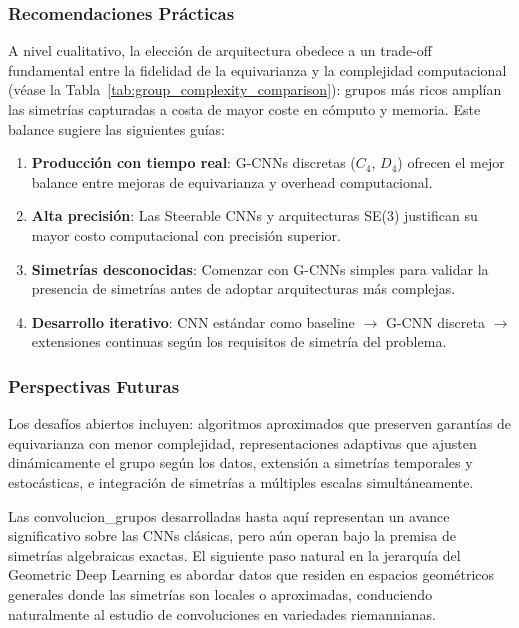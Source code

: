 \subsubsection{Recomendaciones Prácticas}\label{subsubsec:tradeoffs_recomendaciones}

A nivel cualitativo, la elección de arquitectura obedece a un trade-off fundamental entre la fidelidad de la equivarianza y la complejidad computacional (véase la Tabla~\ref{tab:group_complexity_comparison}): grupos más ricos amplían las simetrías capturadas a costa de mayor coste en cómputo y memoria. Este balance sugiere las siguientes guías:

\begin{enumerate}
    \item \textbf{Producción con tiempo real}: G-CNNs discretas ($C_4$, $D_4$) ofrecen el mejor balance entre mejoras de equivarianza y overhead computacional.
    \item \textbf{Alta precisión}: Las Steerable CNNs y arquitecturas SE(3) justifican su mayor costo computacional con precisión superior.
    \item \textbf{Simetrías desconocidas}: Comenzar con G-CNNs simples para validar la presencia de simetrías antes de adoptar arquitecturas más complejas.
    \item \textbf{Desarrollo iterativo}: CNN estándar como baseline $\to$ G-CNN discreta $\to$ extensiones continuas según los requisitos de simetría del problema.
\end{enumerate}

\subsubsection{Perspectivas Futuras}\label{subsubsec:perspectivas_desarrollo_futuro}

Los desafíos abiertos incluyen: algoritmos aproximados que preserven garantías de equivarianza con menor complejidad, representaciones adaptivas que ajusten dinámicamente el grupo según los datos, extensión a simetrías temporales y estocásticas, e integración de simetrías a múltiples escalas simultáneamente.

Las \glspl{convolucion_grupo} desarrolladas hasta aquí representan un avance significativo sobre las CNNs clásicas, pero aún operan bajo la premisa de simetrías algebraicas exactas. El siguiente paso natural en la jerarquía del Geometric Deep Learning es abordar datos que residen en espacios geométricos generales donde las simetrías son locales o aproximadas, conduciendo naturalmente al estudio de convoluciones en variedades riemannianas.

